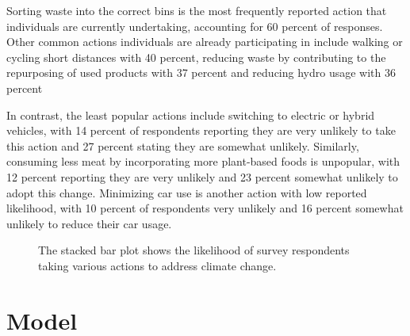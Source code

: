 \documentclass[
  letterpaper,
  DIV=11,
  numbers=noendperiod]{scrartcl}
\begin{document}
Sorting waste into the correct bins is the most frequently reported
action that individuals are currently undertaking, accounting for 60
percent of responses. Other common actions individuals are already
participating in include walking or cycling short distances with 40
percent, reducing waste by contributing to the repurposing of used
products with 37 percent and reducing hydro usage with 36 percent

In contrast, the least popular actions include switching to electric or
hybrid vehicles, with 14 percent of respondents reporting they are very
unlikely to take this action and 27 percent stating they are somewhat
unlikely. Similarly, consuming less meat by incorporating more
plant-based foods is unpopular, with 12 percent reporting they are very
unlikely and 23 percent somewhat unlikely to adopt this change.
Minimizing car use is another action with low reported likelihood, with
10 percent of respondents very unlikely and 16 percent somewhat unlikely
to reduce their car usage.

\begin{figure}


\caption{\label{fig-nine}The stacked bar plot shows the likelihood of
survey respondents taking various actions to address climate change.}

\end{figure}%

\section{Model}\label{sec-model}
\end{document}
